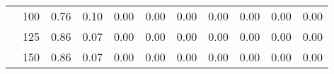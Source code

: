 \begin{table}[t]
\begin{center}
\begin{subtable}[c]{\textwidth}
\begin{center}
\begin{tabular}{rcccccccccc}
                                        & \multicolumn{1}{c|}{100}  & \num{0.76}  & \num{0.10}  & \num{0.00}  & \num{0.00}  & \num{0.00}  & \num{0.00}  & \num{0.00}  & \num{0.00}  & \num{0.00}  \\
                                        & \multicolumn{1}{c|}{125}  & \num{0.86}  & \num{0.07}  & \num{0.00}  & \num{0.00}  & \num{0.00}  & \num{0.00}  & \num{0.00}  & \num{0.00}  & \num{0.00}  \\
                                        & \multicolumn{1}{c|}{150}  & \num{0.86}  & \num{0.07}  & \num{0.00}  & \num{0.00}  & \num{0.00}  & \num{0.00}  & \num{0.00}  & \num{0.00}  & \num{0.00}  \\
                                    \end{tabular}
            \end{center}
        \end{subtable}

        \vspace{5mm}


\end{center}
\end{table}

